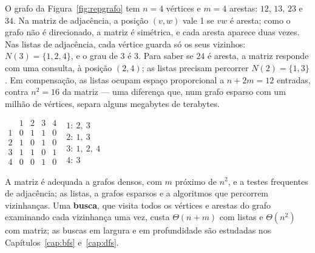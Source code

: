 \begin{exemplo}\label{ex:repgrafo}
O grafo da Figura~\ref{fig:repgrafo} tem $n=4$ vértices e $m=4$ arestas: $12$, $13$, $23$ e $34$. Na matriz de adjacência, a posição $(v,w)$ vale 1 se $vw$ é aresta; como o grafo não é direcionado, a matriz é simétrica, e cada aresta aparece duas vezes. Nas listas de adjacência, cada vértice guarda só os seus vizinhos: $N(3)=\{1,2,4\}$, e o grau de 3 é 3. Para saber se $24$ é aresta, a matriz responde com uma consulta, à posição $(2,4)$; as listas precisam percorrer $N(2)=\{1,3\}$. Em compensação, as listas ocupam espaço proporcional a $n+2m=12$ entradas, contra $n^2=16$ da matriz --- uma diferença que, num grafo esparso com um milhão de vértices, separa alguns megabytes de terabytes.
\begin{figura}
\qquad
\small
$\begin{array}{c|cccc}
 & 1 & 2 & 3 & 4\\ \hline
1 & 0 & 1 & 1 & 0\\
2 & 1 & 0 & 1 & 0\\
3 & 1 & 1 & 0 & 1\\
4 & 0 & 0 & 1 & 0
\end{array}$
\qquad
$\begin{array}{l}
1\colon\ 2,\ 3\\
2\colon\ 1,\ 3\\
3\colon\ 1,\ 2,\ 4\\
4\colon\ 3
\end{array}$
\end{figura}
\end{exemplo}

A matriz é adequada a grafos densos, com $m$ próximo de $n^2$, e a testes frequentes de adjacência; as listas, a grafos esparsos e a algoritmos que percorrem vizinhanças. Uma \textbf{busca}, que visita todos os vértices e arestas do grafo examinando cada vizinhança uma vez, custa $\Theta(n+m)$ com listas e $\Theta(n^2)$ com matriz; as buscas em largura e em profundidade são estudadas nos Capítulos~\ref{cap:bfs} e~\ref{cap:dfs}.

